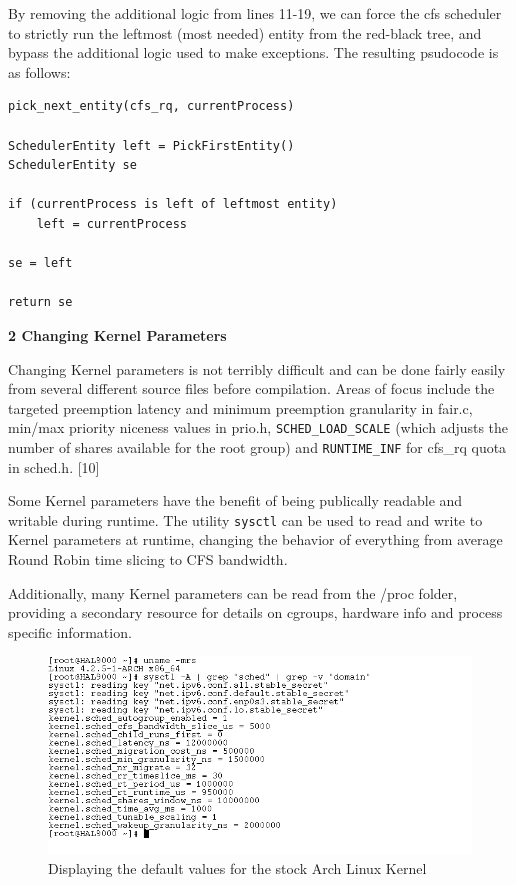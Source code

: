By removing the additional logic from lines 11-19, we can force the cfs scheduler to strictly run the leftmost (most needed) entity from the red-black tree, and bypass the additional logic used to make exceptions. The resulting psudocode is as follows:

\begin{lstlisting}
pick_next_entity(cfs_rq, currentProcess)

SchedulerEntity left = PickFirstEntity()
SchedulerEntity se

if (currentProcess is left of leftmost entity)
	left = currentProcess

se = left

return se
\end{lstlisting}

\vspace{1pc}

\noindent\textbf{2 Changing Kernel Parameters}
\vspace{1pc}

Changing Kernel parameters is not terribly difficult and can be done fairly easily from several different source files before compilation. Areas of focus include the targeted preemption latency and minimum preemption granularity in fair.c, min/max priority niceness values in prio.h, \texttt{SCHED\_LOAD\_SCALE} (which adjusts the number of shares available for the root group) and \texttt{RUNTIME\_INF} for cfs\_rq quota in sched.h. [10]

Some Kernel parameters have the benefit of being publically readable and  writable during runtime. The utility \texttt{sysctl} can be used to read and write to Kernel parameters at runtime, changing the behavior of everything from average Round Robin time slicing to CFS bandwidth.

Additionally, many Kernel parameters can be read from the /proc folder, providing a secondary resource for details on cgroups, hardware info and process specific information.

\begin{figure}[hb]
	\includegraphics[width=1.0\columnwidth]{images/sysctl}
	\caption{Displaying the default values for the stock Arch Linux Kernel}
\end{figure}


